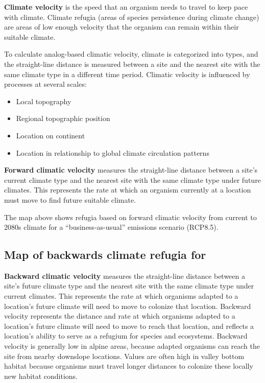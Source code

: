 \documentclass[
]{article}
\providecommand{\tightlist}{%
  \setlength{\itemsep}{0pt}\setlength{\parskip}{0pt}}
\begin{document}
\textbf{Climate velocity} is the speed that an organism needs to travel
to keep pace with climate. Climate refugia (areas of species persistence
during climate change) are areas of low enough velocity that the
organism can remain within their suitable climate.

To calculate analog-based climatic velocity, climate is categorized into
types, and the straight-line distance is measured between a site and the
nearest site with the same climate type in a different time period.
Climatic velocity is influenced by processes at several scales:

\begin{itemize}
\tightlist
\item
  Local topography
\item
  Regional topographic position
\item
  Location on continent
\item
  Location in relationship to global climate circulation patterns
\end{itemize}

\textbf{Forward climatic velocity} measures the straight-line distance
between a site's current climate type and the nearest site with the same
climate type under future climates. This represents the rate at which an
organism currently at a location must move to find future suitable
climate.

The map above shows refugia based on forward climatic velocity from
current to 2080s climate for a ``business-as-usual'' emissions scenario
(RCP8.5).

\pagebreak

\hypertarget{map-of-backwards-climate-refugia-for}{%
\subsection{Map of backwards climate refugia
for}\label{map-of-backwards-climate-refugia-for}}

\textbf{Backward climatic velocity} measures the straight-line distance
between a site's future climate type and the nearest site with the same
climate type under current climates. This represents the rate at which
organisms adapted to a location's future climate will need to move to
colonize that location. Backward velocity represents the distance and
rate at which organisms adapted to a location's future climate will need
to move to reach that location, and reflects a location's ability to
serve as a refugium for species and ecosystems. Backward velocity is
generally low in alpine areas, because adapted organisms can reach the
site from nearby downslope locations. Values are often high in valley
bottom habitat because organisms must travel longer distances to
colonize these locally new habitat conditions.
\end{document}
